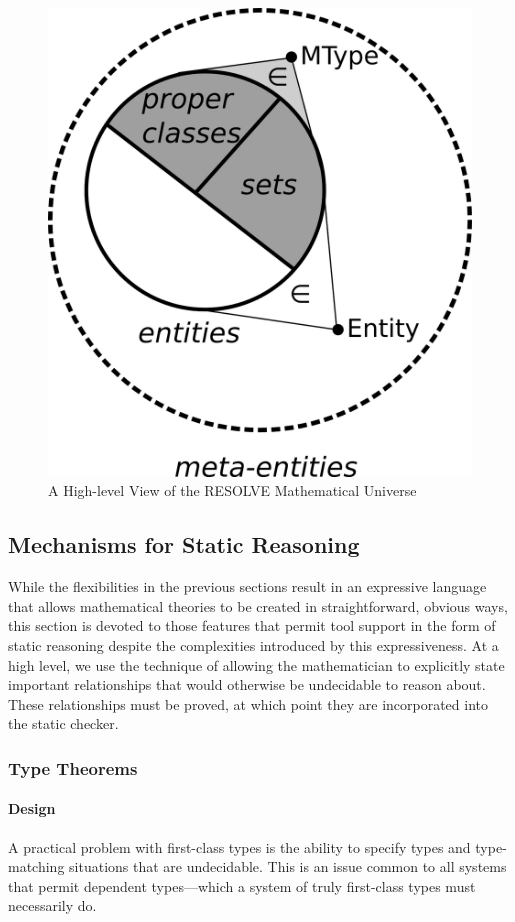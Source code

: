 \begin{figure}
  \centering
    \includegraphics[width=.33\textwidth]{universe}
  \caption{A High-level View of the RESOLVE Mathematical Universe\label{fig:universe}}
\end{figure}

	\subsection{Mechanisms for Static Reasoning\label{staticReasoning}}

While the flexibilities in the previous sections result in an expressive language that allows mathematical theories to be created in straightforward, obvious ways, this section is devoted to those features that permit tool support in the form of static reasoning despite the complexities introduced by this expressiveness.  At a high level, we use the technique of allowing the mathematician to explicitly state important relationships that would otherwise be undecidable to reason about.  These relationships must be proved, at which point they are incorporated into the static checker.

		\subsubsection{Type Theorems\label{typeTheorems}}

\paragraph{Design\label{typeTheoremDesign}}
A practical problem with first-class types is the ability to specify types and type-matching situations that are undecidable.  This is an issue common to all systems that permit dependent types---which a system of truly first-class types must necessarily do.

